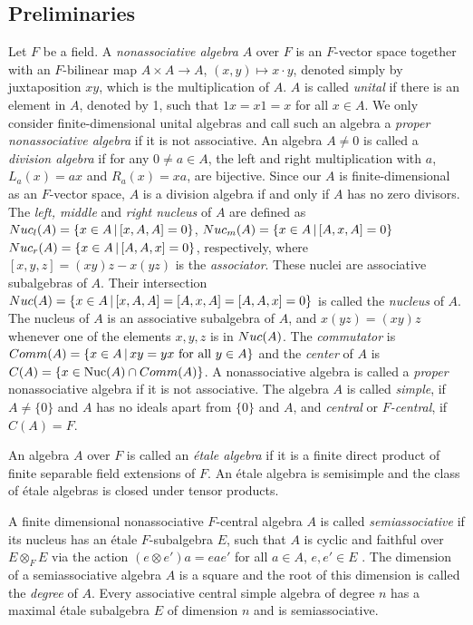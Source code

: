 \documentclass[11pt]{amsart}
\theoremstyle{plain}
\theoremstyle{definition}
\begin{document}
\subsection{Preliminaries} Let $F$ be a field.  A \emph{nonassociative algebra} $A$ over $F$ is an $F$-vector space together with
 an $F$-bilinear map $A\times A\to A$, $(x,y) \mapsto x \cdot y$, denoted simply by juxtaposition $xy$, which is
the multiplication of $A$.
 $A$ is called \emph{unital} if there is an element in $A$, denoted by 1, such that $1x=x1=x$ for all $x\in A$.
We only consider finite-dimensional unital algebras and call such an algebra a \emph{proper nonassociative algebra} if it is not associative.
 An algebra $A\not=0$ is called a {\it division algebra} if for any $0\not=a\in A$,
the left and right multiplication  with $a$, $L_a(x)=ax$ and $R_a(x)=xa$, are bijective.
Since our $A$ is finite-dimensional as an $F$-vector space,  $A$ is a division algebra if and only if $A$ has no zero divisors.
 The {\it left, middle} and \emph{right nucleus} of $A$ are defined as ${\rm
Nuc}_l(A) = \{ x \in A \, \vert \, [x, A, A]  = 0 \}$,  ${\rm Nuc}_m(A) = \{ x \in A \, \vert \, [A, x, A]  = 0 \}$
${\rm Nuc}_r(A) = \{ x \in A \, \vert \, [A,A, x]  = 0 \}$, respectively, where $[x, y, z] =
(xy) z - x (yz)$ is the {\it associator}. These nuclei are associative
subalgebras of $A$. Their intersection
 ${\rm Nuc}(A) = \{ x \in A \, \vert \, [x, A, A] = [A, x, A] = [A,A, x] = 0 \}$ is called the {\it nucleus} of $A$.
The nucleus of $A$ is an associative subalgebra of $A$,
and $x(yz) = (xy) z$ whenever one of the elements $x, y, z$ is in
${\rm Nuc}(A)$. The \emph{commutator} is
 ${\rm Comm}(A)=\{x\in A\,|\, xy=yx \text{ for all } y\in A\}$ and the
 {\it center} of $A$ is ${\rm C}(A)=\{x\in \text{Nuc}(A)\cap {\rm Comm}(A)\}$.
 A nonassociative algebra is called a \emph{proper} nonassociative algebra if it is not associative.
 The algebra $A $ is called \emph{simple}, if $A\not =\{0\}$ and $A$ has no ideals apart from $\{0\}$ and $A$, and \emph{central} or \emph{$F$-central}, if $C(A)=F$.


 An algebra $A$ over $F$ is called an  \emph{\'etale algebra} if it is a finite direct product of finite separable field extensions of $F$.  An \'etale algebra is semisimple and the class of \'etale algebras is closed under tensor products.



A finite dimensional nonassociative $F$-central algebra $A$ is called \emph{semiassociative} if its nucleus has an \'etale $F$-subalgebra  $E$, such that $A$ is cyclic and faithful
over $E\otimes_F E$ via the action $(e\otimes e')a=eae'$ for all $a\in A$, $e,e'\in E$ \cite{BHMRV}.
The dimension of a semiassociative algebra $A$ is a square \cite[Corollary 3.4]{BHMRV} and the root of this dimension is called the
\emph{degree} of $A$. Every associative central simple algebra of degree $n$ has a maximal \'etale subalgebra $E$ of dimension $n$ and is semiassociative.
\end{document}
